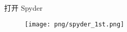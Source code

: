\documentclass[main.tex]{subfiles}
\begin{document}
	
打开 Spyder
\begin{figure}[t]
	\texttt{[image: png/spyder\_1st.png]}
\end{figure}
\end{document}
